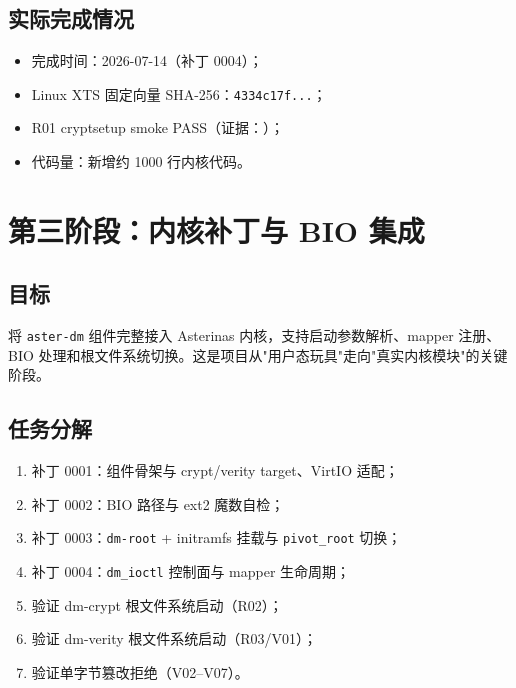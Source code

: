 \subsection{实际完成情况}
\begin{itemize}
    \item 完成时间：2026-07-14（补丁 0004）；
    \item Linux XTS 固定向量 SHA-256：\texttt{4334c17f...}；
    \item R01 cryptsetup smoke PASS（证据：\texttt{}）；
    \item 代码量：新增约 1000 行内核代码。
\end{itemize}

\section{第三阶段：内核补丁与 BIO 集成}

\subsection{目标}
将 \texttt{aster-dm} 组件完整接入 Asterinas 内核，支持启动参数解析、mapper 注册、BIO 处理和根文件系统切换。这是项目从"用户态玩具"走向"真实内核模块"的关键阶段。

\subsection{任务分解}
\begin{enumerate}
    \item 补丁 0001：组件骨架与 crypt/verity target、VirtIO 适配；
    \item 补丁 0002：BIO 路径与 ext2 魔数自检；
    \item 补丁 0003：\texttt{dm-root} + initramfs 挂载与 \texttt{pivot\_root} 切换；
    \item 补丁 0004：\texttt{dm\_ioctl} 控制面与 mapper 生命周期；
    \item 验证 dm-crypt 根文件系统启动（R02）；
    \item 验证 dm-verity 根文件系统启动（R03/V01）；
    \item 验证单字节篡改拒绝（V02--V07）。
\end{enumerate}

